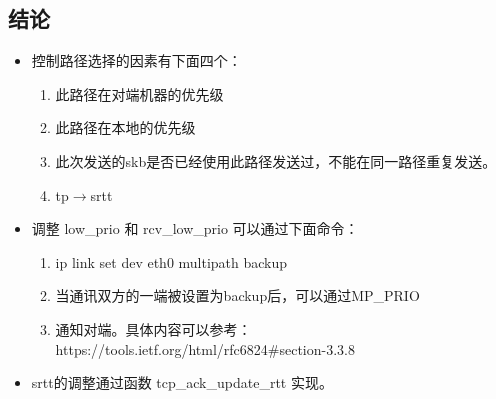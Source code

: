 \subsection{结论}
\begin{itemize}
  \item 控制路径选择的因素有下面四个：
    \begin{enumerate}
        \item 此路径在对端机器的优先级
        \item 此路径在本地的优先级
        \item 此次发送的skb是否已经使用此路径发送过，不能在同一路径重复发送。
        \item tp$\rightarrow$srtt
    \end{enumerate}
  \item 调整 low\_prio 和 rcv\_low\_prio 可以通过下面命令：
    \begin{enumerate}
    \item ip link set dev eth0 multipath backup
    \item 当通讯双方的一端被设置为backup后，可以通过MP\_PRIO
    \item 通知对端。具体内容可以参考：https://tools.ietf.org/html/rfc6824\#section-3.3.8
    \end{enumerate}
  \item srtt的调整通过函数 tcp\_ack\_update\_rtt 实现。
\end{itemize}
